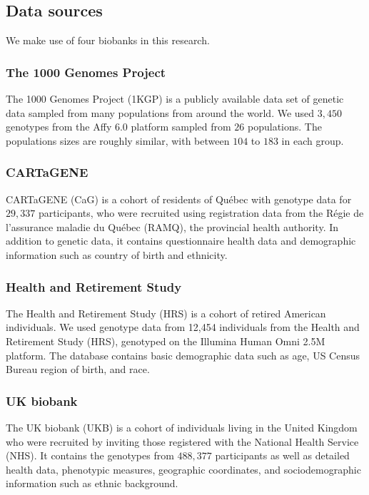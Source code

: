 \subsection{Data sources}

We make use of four biobanks in this research.

\subsubsection{The 1000 Genomes Project}

The 1000 Genomes Project (1KGP) is a publicly available data set of genetic data sampled from many populations from around the world\citep{global_2015}. We used $3,450$ genotypes from the Affy 6.0 platform sampled from $26$  populations. The populations sizes are roughly similar, with between $104$ to $183$ in each group.

\subsubsection{CARTaGENE}

CARTaGENE (CaG) is a cohort of residents of Qu\'{e}bec with genotype data for $29,337$ participants, who were recruited using registration data from the R\'{e}gie de l’assurance maladie du Qu\'{e}bec (RAMQ), the provincial health authority\citep{awadalla_cohort_2013}. In addition to genetic data, it contains questionnaire health data and demographic information such as country of birth and ethnicity.

\subsubsection{Health and Retirement Study}

The Health and Retirement Study (HRS) is a cohort of retired American individuals\citep{juster_overview_1995}. We used genotype data from 12,454 individuals from the Health and Retirement Study (HRS), genotyped on the Illumina Human Omni 2.5M platform. The database contains basic demographic data such as age, US Census Bureau region of birth, and race.

\subsubsection{UK biobank}

The UK biobank (UKB) is a cohort of individuals living in the United Kingdom who were recruited by inviting those registered with the National Health Service (NHS)\citep{sudlow_uk_2015}. It contains the genotypes from $488,377$ participants as well as detailed health data, phenotypic measures, geographic coordinates, and sociodemographic information such as ethnic background.

